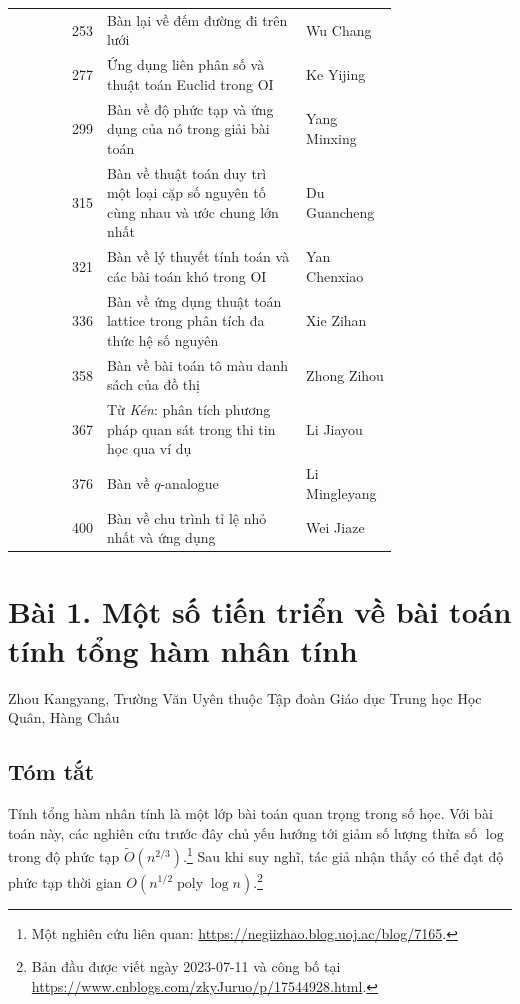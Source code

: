 \documentclass[11pt]{article}
\begin{document}
\begin{center}
\begin{tabular}{r p{0.52\linewidth} p{0.24\linewidth}}
253 & Bàn lại về đếm đường đi trên lưới & Wu Chang \\
277 & Ứng dụng liên phân số và thuật toán Euclid trong OI & Ke Yijing \\
299 & Bàn về độ phức tạp và ứng dụng của nó trong giải bài toán & Yang Minxing \\
315 & Bàn về thuật toán duy trì một loại cặp số nguyên tố cùng nhau và ước chung lớn nhất & Du Guancheng \\
321 & Bàn về lý thuyết tính toán và các bài toán khó trong OI & Yan Chenxiao \\
336 & Bàn về ứng dụng thuật toán lattice trong phân tích đa thức hệ số nguyên & Xie Zihan \\
358 & Bàn về bài toán tô màu danh sách của đồ thị & Zhong Zihou \\
367 & Từ \emph{Kén}: phân tích phương pháp quan sát trong thi tin học qua ví dụ & Li Jiayou \\
376 & Bàn về \(q\)-analogue & Li Mingleyang \\
400 & Bàn về chu trình tỉ lệ nhỏ nhất và ứng dụng & Wei Jiaze
\end{tabular}
\end{center}

\section*{Bài 1. Một số tiến triển về bài toán tính tổng hàm nhân tính}

\begin{center}
Zhou Kangyang, Trường Văn Uyên thuộc Tập đoàn Giáo dục Trung học Học Quân,
Hàng Châu
\end{center}

\subsection*{Tóm tắt}

Tính tổng hàm nhân tính là một lớp bài toán quan trọng trong số học. Với bài
toán này, các nghiên cứu trước đây chủ yếu hướng tới giảm số lượng thừa số
\(\log\) trong độ phức tạp \(\widetilde O(n^{2/3})\).\footnote{Một nghiên cứu
liên quan: \url{https://negiizhao.blog.uoj.ac/blog/7165}.} Sau khi suy nghĩ,
tác giả nhận thấy có thể đạt độ phức tạp thời gian
\(O(n^{1/2}\operatorname{poly}\log n)\).\footnote{Bản đầu được viết ngày
2023-07-11 và công bố tại
\url{https://www.cnblogs.com/zkyJuruo/p/17544928.html}.}
\end{document}
